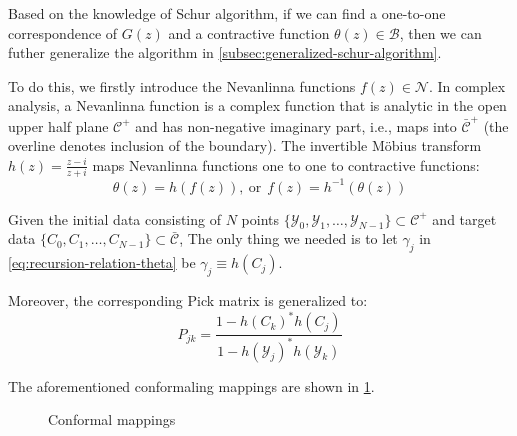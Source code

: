 \documentclass[
	preprint,%
	aps,
	prb,
	showpacs,	
	amsmath, amssymb]{revtex4-2}
\newcommand{\Y}{ {\mathcal{Y}} }
\newcommand{\C}{ {\mathcal{C}} }
\newcommand{\Cbar}{ {\bar{\mathcal{C}}} }
\newcommand{\D}{ {\mathcal{D}} }
\newcommand{\Dbar}{ {\bar{\mathcal{D}}} }
\newcommand{\B}{ {\mathcal{B}} }
\newcommand{\N}{ {\mathcal{N}} }
\begin{document}
Based on the knowledge of Schur algorithm, if we can find 
a one-to-one correspondence of $G(z)$ and a contractive 
function $\theta(z) \in \B$, then we can futher generalize 
the algorithm in \cref{subsec:generalized-schur-algorithm}.

To do this, we firstly introduce the Nevanlinna functions $f(z) \in \N$.
In complex analysis, a Nevanlinna function is a complex
function that is analytic in the open upper half plane $\C^+$ and
has non-negative imaginary part, i.e., maps into $\Cbar^+$ (the
overline denotes inclusion of the boundary).
The invertible Möbius transform $h(z) = \frac{z-i}{z+i}$ 
maps Nevanlinna functions one to one to contractive
functions:
\begin{equation}\label{eq:f-theta-relation}
	\theta(z) = h(f(z)),\ \mathrm{or} \ \
	f(z) = h^{-1}(\theta(z))
\end{equation}

Given the initial data consisting of $N$ points 
$\{\Y_0, \Y_1, \dots ,\Y_{N-1}\} \subset \C^+$ and target data
$\{C_0, C_1, \dots ,C_{N-1}\} \subset \Cbar$, 
The only thing we needed is to let $\gamma_j$ in 
\cref{eq:recursion-relation-theta} be $\gamma_j \equiv h(C_j)$.

Moreover, the corresponding Pick matrix is generalized to:
\begin{equation}\label{eq:pick-matrix-nevanlinna}
	P_{jk} = \frac{1-h(C_k)^* h(C_j)}{1 - h(\Y_j)^* h(\Y_k)}
\end{equation}

The aforementioned conformaling mappings are shown in \cref{fig:conformal-map}.
\begin{figure}[htbp]
	\centering
	\begin{minipage}[t]{0.7\linewidth}
		\centering
	\end{minipage}
	\caption{Conformal mappings}
	\label{fig:conformal-map}
\end{figure}
\end{document}
